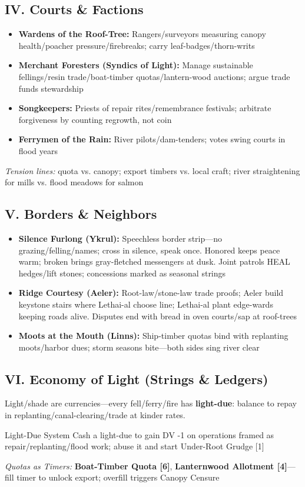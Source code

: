 \documentclass[11pt]{book}
\begin{document}
\subsection{IV. Courts \& Factions}
\begin{itemize}
    \item \textbf{Wardens of the Roof-Tree:} Rangers/surveyors measuring canopy health/poacher pressure/firebreaks; carry leaf-badges/thorn-writs
    \item \textbf{Merchant Foresters (Syndics of Light):} Manage sustainable fellings/resin trade/boat-timber quotas/lantern-wood auctions; argue trade funds stewardship
    \item \textbf{Songkeepers:} Priests of repair rites/remembrance festivals; arbitrate forgiveness by counting regrowth, not coin
    \item \textbf{Ferrymen of the Rain:} River pilots/dam-tenders; votes swing courts in flood years
\end{itemize}
\textit{Tension lines:} quota vs. canopy; export timbers vs. local craft; river straightening for mills vs. flood meadows for salmon

\subsection{V. Borders \& Neighbors}
\begin{itemize}
    \item \textbf{Silence Furlong (Ykrul):} Speechless border strip---no grazing/felling/names; cross in silence, speak once. Honored keeps peace warm; broken brings gray-fletched messengers at dusk. Joint patrols HEAL hedges/lift stones; concessions marked as seasonal strings
    \item \textbf{Ridge Courtesy (Aeler):} Root-law/stone-law trade proofs; Aeler build keystone stairs where Lethai-al choose line; Lethai-al plant edge-wards keeping roads alive. Disputes end with bread in oven courts/sap at roof-trees
    \item \textbf{Moots at the Mouth (Linns):} Ship-timber quotas bind with replanting moots/harbor dues; storm seasons bite---both sides sing river clear
\end{itemize}

\subsection{VI. Economy of Light (Strings \& Ledgers)}
Light/shade are currencies---every fell/ferry/fire has \textbf{light-due}: balance to repay in replanting/canal-clearing/trade at kinder rates.
\begin{atTheTable}{Light-Due System}
Cash a light-due to gain DV -1 on operations framed as repair/replanting/flood work; abuse it and start Under-Root Grudge [1]
\end{atTheTable}
\textit{Quotas as Timers:} \textbf{Boat-Timber Quota [6]}, \textbf{Lanternwood Allotment [4]}---fill timer to unlock export; overfill triggers Canopy Censure
\end{document}
